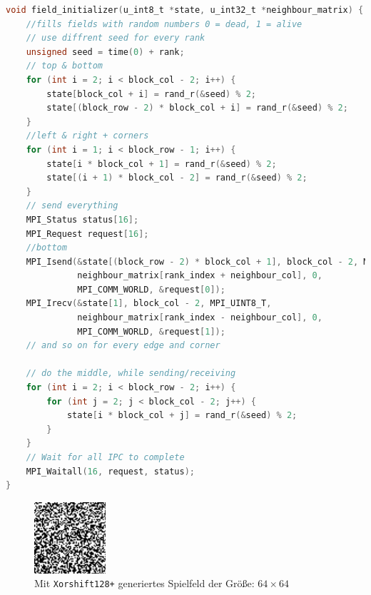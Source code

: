 \documentclass[german,plainarticle,hyperref,utf8]{zihpub}
\begin{document}
	\begin{lstlisting}[language=C, caption=Daten Initialisierung]
void field_initializer(u_int8_t *state, u_int32_t *neighbour_matrix) {
	//fills fields with random numbers 0 = dead, 1 = alive
	// use diffrent seed for every rank
	unsigned seed = time(0) + rank;
	// top & bottom
	for (int i = 2; i < block_col - 2; i++) {
		state[block_col + i] = rand_r(&seed) % 2;
		state[(block_row - 2) * block_col + i] = rand_r(&seed) % 2;
	}
	//left & right + corners
	for (int i = 1; i < block_row - 1; i++) {
		state[i * block_col + 1] = rand_r(&seed) % 2;
		state[(i + 1) * block_col - 2] = rand_r(&seed) % 2;
	}
	// send everything
	MPI_Status status[16];
	MPI_Request request[16];
	//bottom
	MPI_Isend(&state[(block_row - 2) * block_col + 1], block_col - 2, MPI_UINT8_T,
	          neighbour_matrix[rank_index + neighbour_col], 0, 
	          MPI_COMM_WORLD, &request[0]);
	MPI_Irecv(&state[1], block_col - 2, MPI_UINT8_T,
	          neighbour_matrix[rank_index - neighbour_col], 0,
	          MPI_COMM_WORLD, &request[1]);
	// and so on for every edge and corner
	
	// do the middle, while sending/receiving
	for (int i = 2; i < block_row - 2; i++) {
		for (int j = 2; j < block_col - 2; j++) {
			state[i * block_col + j] = rand_r(&seed) % 2;
		}
	}
	// Wait for all IPC to complete
	MPI_Waitall(16, request, status);
}\end{lstlisting}
	\begin{figure}[h]
		\begin{center}
			\includegraphics[scale=5.0]{initialized_board.pdf}
		\end{center}
		\caption{Mit \texttt{Xorshift128+} generiertes Spielfeld der Größe: $64\times 64$}
	\end{figure}
	
\end{document}
